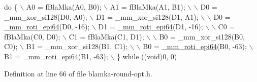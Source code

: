 \begin{DoxyCode}
\textcolor{keywordflow}{do} \{                                                                       \(\backslash\)
        A0 = fBlaMka(A0, B0);                                                  \(\backslash\)
        A1 = fBlaMka(A1, B1);                                                  \(\backslash\)
                                                                               \(\backslash\)
        D0 = \_mm\_xor\_si128(D0, A0);                                            \(\backslash\)
        D1 = \_mm\_xor\_si128(D1, A1);                                            \(\backslash\)
                                                                               \(\backslash\)
        D0 = \hyperlink{blamka-round-opt_8h_a4b2c5cdf0a7ce77d4b1acfe1b4fc7883}{\_mm\_roti\_epi64}(D0, -16);                                          \(\backslash\)
        D1 = \hyperlink{blamka-round-opt_8h_a4b2c5cdf0a7ce77d4b1acfe1b4fc7883}{\_mm\_roti\_epi64}(D1, -16);                                          \(\backslash\)
                                                                               \(\backslash\)
        C0 = fBlaMka(C0, D0);                                                  \(\backslash\)
        C1 = fBlaMka(C1, D1);                                                  \(\backslash\)
                                                                               \(\backslash\)
        B0 = \_mm\_xor\_si128(B0, C0);                                            \(\backslash\)
        B1 = \_mm\_xor\_si128(B1, C1);                                            \(\backslash\)
                                                                               \(\backslash\)
        B0 = \hyperlink{blamka-round-opt_8h_a4b2c5cdf0a7ce77d4b1acfe1b4fc7883}{\_mm\_roti\_epi64}(B0, -63);                                          \(\backslash\)
        B1 = \hyperlink{blamka-round-opt_8h_a4b2c5cdf0a7ce77d4b1acfe1b4fc7883}{\_mm\_roti\_epi64}(B1, -63);                                          \(\backslash\)
    \} \textcolor{keywordflow}{while} ((\textcolor{keywordtype}{void})0, 0)
\end{DoxyCode}


Definition at line 66 of file blamka-\/round-\/opt.\+h.

\hypertarget{blamka-round-opt_8h_a8c3e6d429c117a457d672f91bba5343c}{}
